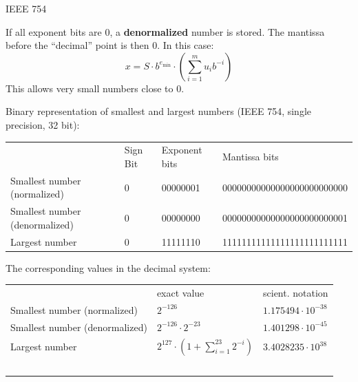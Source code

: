 \begin{vbframe}{IEEE 754}
\lz

If all exponent bits are $0$, a \textbf{denormalized} number is stored. The mantissa before the \enquote{decimal} point is then $0$. In this case:
$$
x = S \cdot b^{e_{\min}} \cdot \left(\sum_{i=1}^m u_{i} b^{-i}\right) %
$$
This allows very small numbers close to 0.

\framebreak
Binary representation of smallest and largest numbers (IEEE 754, single precision, 32 bit):
\begin{scriptsize}
\begin{table}
    \begin{tabular}{llll}
    ~ & Sign Bit & Exponent bits & Mantissa bits \\
    Smallest number (normalized) & 0 & 00000001 & 00000000000000000000000000 \\
    Smallest number (denormalized) & 0 & 00000000 & 00000000000000000000000001 \\
    Largest number & 0 & 11111110 & 11111111111111111111111111 \\
    \end{tabular}
\end{table}
\end{scriptsize}

The corresponding values in the decimal system:

\begin{footnotesize}
\begin{table}
    \begin{tabular}{lll}
    ~ & exact value & scient. notation\\
     Smallest number (normalized) & $2^{-126}$ & $1.175494 \cdot 10^{-38}$ \\
    Smallest number (denormalized) & $2^{-126} \cdot 2^{-23}$ & $1.401298 \cdot 10^{-45}$ \\
     Largest number & $2^{127} \cdot (1+\sum_{i=1}^{23} 2^{-i})$ & $3.4028235 \cdot 10^{38}$\\\
    \end{tabular}
\end{table}
\end{footnotesize}

\framebreak




\end{vbframe}
